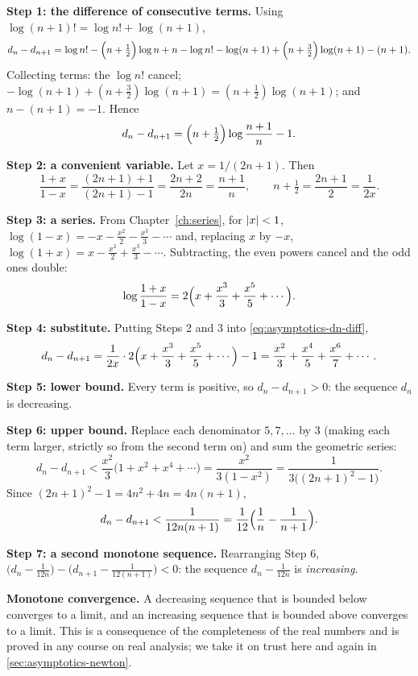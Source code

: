\textbf{Step 1: the difference of consecutive terms.} Using $\log(n+1)!=\log n!+\log(n+1)$,
\[
d_n-d_{n+1}
=\log n!-\Bigl(n+\tfrac12\Bigr)\log n+n-\log n!-\log(n+1)+\Bigl(n+\tfrac32\Bigr)\log(n+1)-(n+1).
\]
Collecting terms: the $\log n!$ cancel; $-\log(n+1)+(n+\tfrac32)\log(n+1)=(n+\tfrac12)\log(n+1)$; and $n-(n+1)=-1$. Hence
\begin{equation}
d_n-d_{n+1}=\Bigl(n+\tfrac12\Bigr)\log\frac{n+1}{n}-1 .
\label{eq:asymptotics-dn-diff}
\end{equation}

\textbf{Step 2: a convenient variable.} Let $x=1/(2n+1)$. Then
\[
\frac{1+x}{1-x}=\frac{(2n+1)+1}{(2n+1)-1}=\frac{2n+2}{2n}=\frac{n+1}{n},\qquad n+\tfrac12=\frac{2n+1}{2}=\frac{1}{2x}.
\]

\textbf{Step 3: a series.} From Chapter~\ref{ch:series}, for $\left\lvert x\right\rvert<1$,
$\log(1-x)=-x-\tfrac{x^2}{2}-\tfrac{x^3}{3}-\cdots$ and, replacing $x$ by $-x$, $\log(1+x)=x-\tfrac{x^2}{2}+\tfrac{x^3}{3}-\cdots$. Subtracting, the even powers cancel and the odd ones double:
\[
\log\frac{1+x}{1-x}=2\Bigl(x+\frac{x^3}{3}+\frac{x^5}{5}+\cdots\Bigr).
\]

\textbf{Step 4: substitute.} Putting Steps 2 and 3 into \cref{eq:asymptotics-dn-diff},
\[
d_n-d_{n+1}=\frac{1}{2x}\cdot2\Bigl(x+\frac{x^3}{3}+\frac{x^5}{5}+\cdots\Bigr)-1=\frac{x^2}{3}+\frac{x^4}{5}+\frac{x^6}{7}+\cdots .
\]

\textbf{Step 5: lower bound.} Every term is positive, so $d_n-d_{n+1}>0$: the sequence $d_n$ is decreasing.

\textbf{Step 6: upper bound.} Replace each denominator $5,7,\dots$ by $3$ (making each term larger, strictly so from the second term on) and sum the geometric series:
\[
d_n-d_{n+1}<\frac{x^2}{3}\bigl(1+x^2+x^4+\cdots\bigr)=\frac{x^2}{3(1-x^2)}=\frac{1}{3\bigl((2n+1)^2-1\bigr)} .
\]
Since $(2n+1)^2-1=4n^2+4n=4n(n+1)$,
\[
d_n-d_{n+1}<\frac{1}{12n(n+1)}=\frac{1}{12}\Bigl(\frac1n-\frac1{n+1}\Bigr).
\]

\textbf{Step 7: a second monotone sequence.} Rearranging Step 6, $\bigl(d_n-\tfrac1{12n}\bigr)-\bigl(d_{n+1}-\tfrac1{12(n+1)}\bigr)<0$: the sequence $d_n-\tfrac{1}{12n}$ is \emph{increasing}.

\begin{beyond}
\textbf{Monotone convergence.} A decreasing sequence that is bounded below converges to a limit, and an increasing sequence that is bounded above converges to a limit. This is a consequence of the completeness of the real numbers and is proved in any course on real analysis; we take it on trust here and again in \cref{sec:asymptotics-newton}.
\end{beyond}

